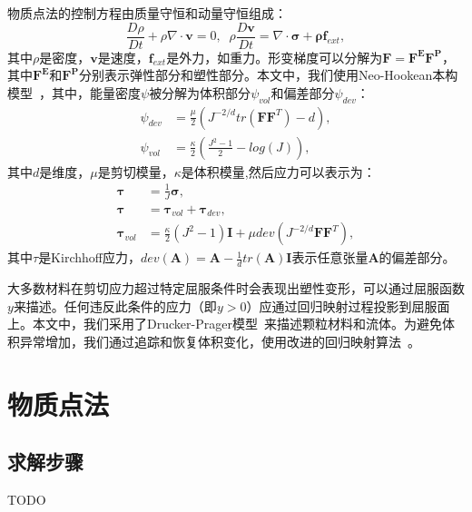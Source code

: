 物质点法的控制方程由质量守恒和动量守恒组成：
\begin{equation}
\frac{D\rho}{Dt}+\rho \nabla \cdot \mathbf{v} = 0, \;\;
\rho \frac{D \mathbf{v}}{Dt} = \nabla \cdot\mathbf{\sigma} + \mathbf{\rho} \mathbf{f}_{ext},
\end{equation}
其中$\rho$是密度，$\mathbf{v}$是速度，$\mathbf{f}_{ext}$是外力，如重力。形变梯度可以分解为$\mathbf{F}=\mathbf{F^E}\mathbf{F^P}$，其中$\mathbf{F^E}$和$\mathbf{F^P}$分别表示弹性部分和塑性部分。本文中，我们使用Neo-Hookean本构模型~\cite{DBLP:journals/tog/TuLZLWWQ24}，其中，能量密度$\psi$被分解为体积部分$\psi_{vol}$和偏差部分$\psi_{dev}$：
\begin{equation}
    \begin{aligned}
        \psi_{dev} &= \frac{\mu}{2}(J^{-2/d} tr(\mathbf{F}\mathbf{F}^T) - d), \\
        \psi_{vol} &= \frac{\kappa}{2}(
        \frac{J^2-1}{2}-log(J)
        ),
    \end{aligned}
\end{equation}
其中$d$是维度，$\mu$是剪切模量，$\kappa$是体积模量,然后应力可以表示为：
\begin{equation}
\begin{aligned}
    \mathbf{\tau} &= \frac{1}{J}\mathbf{\sigma},\\
    \mathbf{\tau} &= \mathbf{\tau}_{vol}+\mathbf{\tau}_{dev},\\
    \mathbf{\tau}_{vol} &= \frac{\kappa}{2}(J^2-1)\mathbf{I}+\mu dev(J^{-2/d} \mathbf{F}\mathbf{F}^T),
\end{aligned}
\end{equation}
其中$\tau$是Kirchhoff应力，$dev(\mathbf{A})=\mathbf{A}-\frac{1}{d}tr(\mathbf{A})\mathbf{I}$表示任意张量$\mathbf{A}$的偏差部分。

大多数材料在剪切应力超过特定屈服条件时会表现出塑性变形，可以通过屈服函数$y$来描述。任何违反此条件的应力（即$y > 0$）应通过回归映射过程投影到屈服面上。本文中，我们采用了Drucker-Prager模型~\cite{klar2016drucker}来描述颗粒材料和流体。为避免体积异常增加，我们通过追踪和恢复体积变化，使用改进的回归映射算法~\cite{10.1145/3072959.3073651}。


\section{物质点法}
\subsection{求解步骤}
TODO

